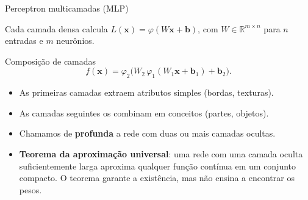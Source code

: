 \documentclass[10pt]{beamer}
\begin{document}
\begin{frame}{Perceptron multicamadas (MLP)}
\centering
{}

\small Cada camada densa calcula $L(\mathbf{x})=\varphi(W\mathbf{x}+\mathbf{b})$, com $W\in\mathbb{R}^{m\times n}$ para $n$ entradas e $m$ neurônios.
\end{frame}

\begin{frame}{Composição de camadas}
\[ f(\mathbf{x})=\varphi_2\big(W_2\,\varphi_1(W_1\mathbf{x}+\mathbf{b}_1)+\mathbf{b}_2\big). \]
\begin{itemize}
 \item As primeiras camadas extraem atributos simples (bordas, texturas).
 \item As camadas seguintes os combinam em conceitos (partes, objetos).
 \item Chamamos de \textbf{profunda} a rede com duas ou mais camadas ocultas.
 \item \textbf{Teorema da aproximação universal}: uma rede com uma camada oculta suficientemente larga aproxima qualquer função contínua em um conjunto compacto. O teorema garante a existência, mas não ensina a encontrar os pesos.
\end{itemize}
\end{frame}
\end{document}

